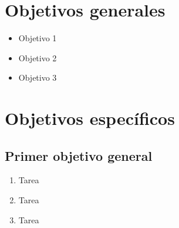\section{Objetivos generales}\label{sec:objetivos-generales}

\begin{itemize}

  \item Objetivo 1
 
  \item Objetivo 2

  \item Objetivo 3
 
\end{itemize}

\section{Objetivos específicos}\label{sec:objetivos-especificos}


\subsection{Primer objetivo general}

 
  \begin{enumerate}
    \item Tarea 
    
    \item Tarea

    \item Tarea
  \end{enumerate}

